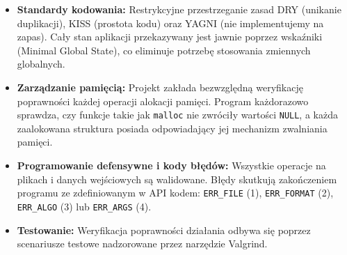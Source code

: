 \documentclass[12pt,a4paper]{article}
\begin{document}
\begin{itemize} 
    \item \textbf{Standardy kodowania:} Restrykcyjne przestrzeganie zasad DRY (unikanie duplikacji), KISS (prostota kodu) oraz YAGNI (nie implementujemy na zapas). Cały stan aplikacji przekazywany jest jawnie poprzez wskaźniki (Minimal Global State), co eliminuje potrzebę stosowania zmiennych globalnych. 
    \item \textbf{Zarządzanie pamięcią:} Projekt zakłada bezwzględną weryfikację poprawności każdej operacji alokacji pamięci. Program każdorazowo sprawdza, czy funkcje takie jak \texttt{malloc} nie zwróciły wartości \texttt{NULL}, a każda zaalokowana struktura posiada odpowiadający jej mechanizm zwalniania pamięci.
    \item \textbf{Programowanie defensywne i kody błędów:} Wszystkie operacje na plikach i danych wejściowych są walidowane. Błędy skutkują zakończeniem programu ze zdefiniowanym w API kodem: \texttt{ERR\_FILE} (1), \texttt{ERR\_FORMAT} (2), \texttt{ERR\_ALGO} (3) lub \texttt{ERR\_ARGS} (4). 
    \item \textbf{Testowanie:} Weryfikacja poprawności działania odbywa się poprzez scenariusze testowe nadzorowane przez narzędzie Valgrind. 
\end{itemize} 
\end{document}
